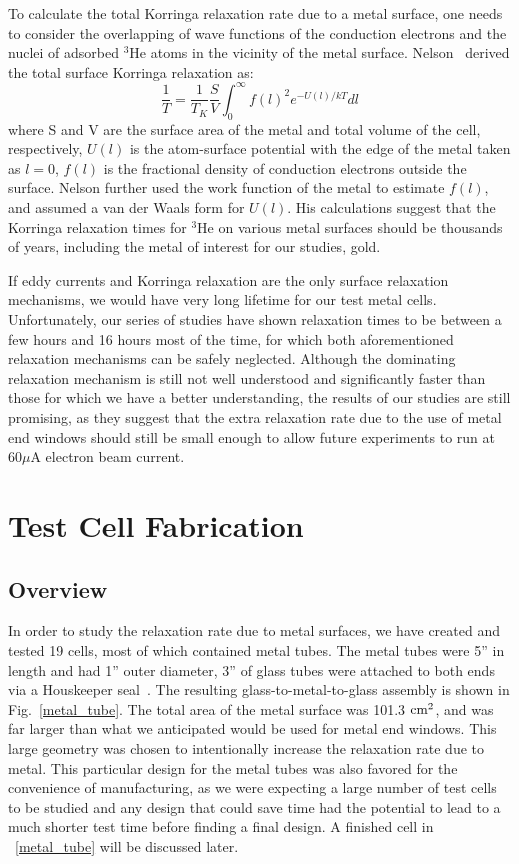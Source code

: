 To calculate the total Korringa relaxation rate due to a metal surface, one needs to consider the overlapping of wave functions of the conduction electrons and the nuclei of adsorbed $^{3}$He atoms in the vicinity of the metal surface. Nelson~\cite{NelsonThesis} derived the total surface Korringa relaxation as:
\begin{equation}
\frac{1}{T}=\frac{1}{T_K}\frac{S}{V}\int_{0}^{\infty} f\left(l\right)^2 e^{-U\left(l\right)/kT}dl
\end{equation}
where S and V are the surface area of the metal and total volume of the cell, respectively, $U\left(l\right)$ is the atom-surface potential with the edge of the metal taken as $l=0$, $f\left(l\right)$ is the fractional density of conduction electrons outside the surface. Nelson further used the work function of the metal to estimate $f\left(l\right)$, and assumed a van der Waals form for $U\left(l\right)$. His calculations suggest that the Korringa relaxation times for $^{3}$He on various metal surfaces should be thousands of years, including the metal of interest for our studies, gold.

If eddy currents and Korringa relaxation are the only surface relaxation mechanisms, we would have very long lifetime for our test metal cells. Unfortunately, our series of studies have shown relaxation times to be between a few hours and 16 hours most of the time, for which both aforementioned relaxation mechanisms can be safely neglected. Although the dominating relaxation mechanism is still not well understood and significantly faster than those for which we have a better understanding, the results of our studies are still promising, as they suggest that the extra relaxation rate due to the use of metal end windows should still be small enough to allow future experiments to run at 60$\mu$A electron beam current.

\section{Test Cell Fabrication}

\subsection{Overview}

In order to study the relaxation rate due to metal surfaces, we have created and tested 19 cells, most of which contained metal tubes. The metal tubes were 5'' in length and had 1'' outer diameter, 3'' of glass tubes were attached to both ends via a Houskeeper seal~\cite{Houskeeper}. The resulting glass-to-metal-to-glass assembly is shown in Fig.~\ref{metal_tube}. The total area of the metal surface was 101.3 ${\rm cm^2}$, and was far larger than what we anticipated would be used for metal end windows. This large geometry was chosen to intentionally increase the relaxation rate due to metal. This particular design for the metal tubes was also favored for the convenience of manufacturing, as we were expecting a large number of test cells to be studied and any design that could save time had the potential to lead to a much shorter test time before finding a final design. A finished cell in ~\ref{metal_tube} will be discussed later.

